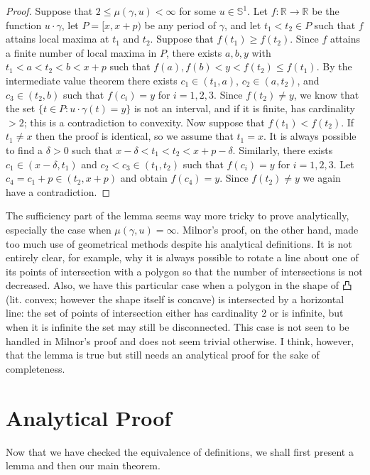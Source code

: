 \documentclass{amsart}
\theoremstyle{definition}
\theoremstyle{remark}
\begin{document}
\begin{proof}
    Suppose that $2\le\mu(\gamma,u)<\infty$ for some $u\in\mathbb{S}^1$.
    Let $f:\mathbb{R}\to\mathbb{R}$ be the function $u\cdot\gamma$,
    let $P=[x,x+p)$ be any period of $\gamma$, and let $t_1<t_2\in P$
    such that $f$ attains local maxima at $t_1$ and $t_2$.
    Suppose that $f(t_1)\ge f(t_2)$.
    Since $f$ attains a finite number of local maxima in $P$,
    there exists $a,b,y$ with $t_1<a<t_2<b<x+p$ such that
    $f(a),f(b)<y<f(t_2)\le f(t_1)$.
    By the intermediate value theorem there exists
    $c_1\in(t_1,a)$, $c_2\in(a,t_2)$, and $c_3\in(t_2,b)$ such that
    $f(c_i)=y$ for $i=1,2,3$. Since $f(t_2)\ne y$, we know that
    the set $\{t\in P:u\cdot\gamma(t)=y\}$ is not an interval,
    and if it is finite, has cardinality $>2$; this is a contradiction
    to convexity. Now suppose that $f(t_1)<f(t_2)$.
    If $t_1\ne x$ then the proof is identical,
    so we assume that $t_1=x$. It is always possible to find
    a $\delta>0$ such that $x-\delta<t_1<t_2<x+p-\delta$.
    Similarly, there exists $c_1\in(x-\delta,t_1)$ and
    $c_2<c_3\in(t_1,t_2)$ such that $f(c_i)=y$ for $i=1,2,3$.
    Let $c_4=c_1+p\in(t_2,x+p)$ and obtain $f(c_4)=y$.
    Since $f(t_2)\ne y$ we again have a contradiction.
\end{proof}

The sufficiency part of the lemma seems way more tricky to prove
analytically, especially the case when $\mu(\gamma,u)=\infty$.
Milnor's proof, on the other hand, made too much use of
geometrical methods despite his analytical definitions.
It is not entirely clear, for example, why it is always possible
to rotate a line about one of its points of intersection with
a polygon so that the number of intersections is not decreased.
Also, we have this particular case when a polygon in the shape of 凸
(lit. convex; however the shape itself is concave)
is intersected by a horizontal line: the set of points of intersection
either has cardinality 2 or is infinite, but when it is infinite
the set may still be disconnected. This case is not seen to
be handled in Milnor's proof and does not seem trivial otherwise.
I think, however, that the lemma is true but still needs
an analytical proof for the sake of completeness.

\section{Analytical Proof}

Now that we have checked the equivalence of definitions,
we shall first present a lemma and then our main theorem.
\end{document}
